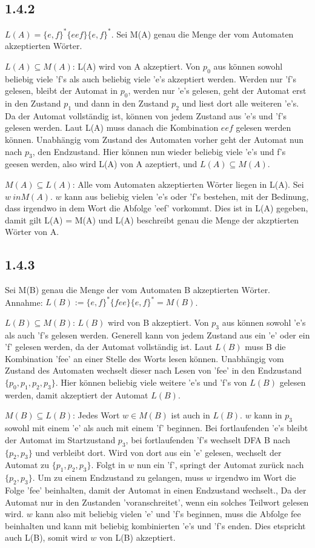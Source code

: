 \documentclass{article}
\begin{document}
\subsection*{1.4.2}
$L(A) =\{e,f\}^*\{eef\}\{e,f\}^*$. Sei M(A) genau die Menge der vom Automaten
akzeptierten Wörter. 

$L(A) \subseteq M(A)$: L(A) wird von A akzeptiert. Von $ p_0$ aus können sowohl
beliebig viele 'f's als auch beliebig viele 'e's akzeptiert werden.  Werden nur
'f's gelesen, bleibt der Automat in $p_0$, werden nur 'e's gelesen, geht der
Automat erst in den Zustand $p_1$ und dann in den Zustand $p_2$ und liest dort
alle weiteren 'e's. Da der Automat vollständig ist, können von jedem Zustand aus
'e's und 'f's gelesen werden. Laut L(A) muss danach die Kombination {$eef$}
gelesen werden können. Unabhängig vom Zustand des Automaten vorher geht der
Automat nun nach $p_3$, den Endzustand. Hier können nun wieder beliebig viele
'e's und f's geesen werden, also wird L(A) von A azeptiert, und $L(A) \subseteq
M(A)$.   

$M(A) \subseteq L(A)$: Alle vom Automaten akzeptierten Wörter liegen in L(A).
Sei $w \ in M(A)$. $w$ kann aus beliebig vielen 'e's oder 'f's bestehen, mit der
Bedinung, dass irgendwo in dem Wort die Abfolge 'eef' vorkommt. Dies ist in L(A)
gegeben, damit gilt L(A) = M(A) und L(A) beschreibt genau die Menge der
akzptierten Wörter von A. 

\subsection*{1.4.3}
Sei M(B) genau die Menge der vom Automaten B akzeptierten Wörter. Annahme: $L(B)
:= \{e,f\}^*\{fee\}\{e,f\}^* = M(B)$.


$L(B) \subseteq M(B)$: $L(B)$ wird von B akzeptiert. Von $p_3$ aus können sowohl
'e's als auch 'f's gelesen werden.  Generell kann von jedem Zustand aus ein 'e'
oder ein 'f' gelesen werden, da der Automat vollständig ist.  Laut $L(B)$ muss B
die Kombination 'fee' an einer Stelle des Worts lesen können. Unabhängig vom
Zustand des Automaten wechselt dieser nach Lesen von 'fee' in den Endzustand
$\{p_0, p_1, p_2, p_3\}$. Hier können beliebig viele weitere 'e's und 'f's von
$L(B)$ gelesen werden, damit akzeptiert der Automat $L(B)$.
 

$M(B) \subseteq L(B)$: Jedes Wort $w \in M(B)$ ist auch in $L(B)$. $w$ kann in
$p_3$ sowohl mit einem 'e' als auch mit einem 'f' beginnen. Bei fortlaufenden
'e's bleibt der Automat im Startzustand $p_3$, bei fortlaufenden 'f's wechselt
DFA B nach $\{p_2, p_3\}$ und verbleibt dort. Wird von dort aus ein 'e' gelesen,
wechselt der Automat zu $\{p_1, p_2, p_3\}$. Folgt in $w$ nun ein 'f', springt
der Automat zurück nach $\{p_2, p_3\}$. Um zu einem Endzustand zu gelangen, muss
$w$ irgendwo im Wort die Folge 'fee' beinhalten, damit der Automat in einen
Endzustand wechselt., Da der Automat nur in den Zustanden 'voranschreitet', wenn
ein solches Teilwort gelesen wird. $w$ kann also mit beliebig vielen 'e' und
'f's beginnen, muss die Abfolge {fee} beinhalten und kann mit beliebig
kombinierten 'e's und 'f's enden. Dies etspricht auch L(B), somit wird $w$ von
L(B) akzeptiert.


 
\end{document}
